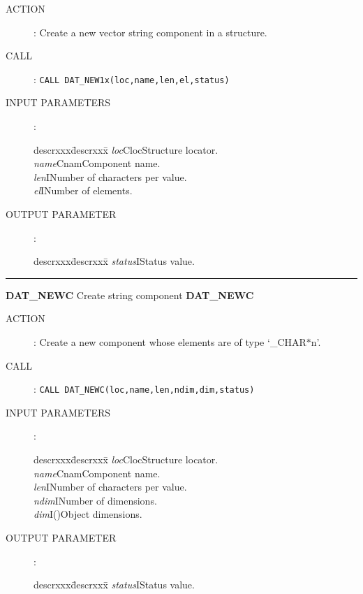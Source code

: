 \begin{description}
\item [ACTION]:
Create a new vector string component in a structure.
\item [CALL]:
{\tt CALL DAT\_NEW1x(loc,name,len,el,status)}
\item [INPUT PARAMETERS]:
\begin{tabbing}
descrxxx\=descrxxx\=\kill
{\em loc}\>Cloc\>Structure locator.\\
{\em name}\>Cnam\>Component name.\\
{\em len}\>I\>Number of characters per value.\\
{\em el}\>I\>Number of elements.
\end{tabbing}
\item [OUTPUT PARAMETER]:
\begin{tabbing}
descrxxx\=descrxxx\=\kill
{\em status}\>I\>Status value.
\end{tabbing}
\end{description}
\goodbreak
\rule{\textwidth}{0.3mm}
{\Large {\bf DAT\_NEWC} \hfill Create string component \hfill {\bf DAT\_NEWC}}
\begin{description}
\item [ACTION]:
Create a new component whose elements are of type `\_CHAR$*$n'.
\item [CALL]:
{\tt CALL DAT\_NEWC(loc,name,len,ndim,dim,status)}
\item [INPUT PARAMETERS]:
\begin{tabbing}
descrxxx\=descrxxx\=\kill
{\em loc}\>Cloc\>Structure locator.\\
{\em name}\>Cnam\>Component name.\\
{\em len}\>I\>Number of characters per value.\\
{\em ndim}\>I\>Number of dimensions.\\
{\em dim}\>I()\>Object dimensions.
\end{tabbing}
\item [OUTPUT PARAMETER]:
\begin{tabbing}
descrxxx\=descrxxx\=\kill
{\em status}\>I\>Status value.
\end{tabbing}
\end{description}
\goodbreak

